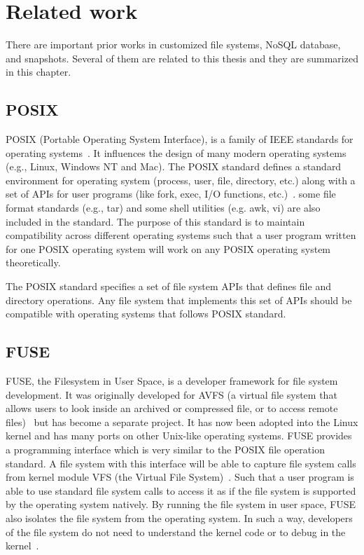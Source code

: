 \chapter{Related work}
\label{chap:related_work}

    There are important prior works in customized file systems, NoSQL database, and snapshots. Several of them are related to this thesis and they are summarized in this chapter.

\section{POSIX}

    POSIX (Portable Operating System Interface), is a family of IEEE standards for operating systems~\cite{posix_wiki}. It influences the design of many modern operating systems (e.g., Linux, Windows NT and Mac). The POSIX standard defines a standard environment for operating system (process, user, file, directory, etc.) along with a set of APIs for user programs (like fork, exec, I/O functions, etc.)~\cite{posix}. some file format standards (e.g., tar) and some shell utilities (e.g. awk, vi) are also included in the standard. The purpose of this standard is to maintain compatibility across different operating systems such that a user program written for one POSIX operating system will work on any POSIX operating system theoretically. 

    The POSIX standard specifies a set of file system APIs that defines file and directory operations. Any file system that implements this set of APIs should be compatible with operating systems that follows POSIX standard.

\section{FUSE}

    FUSE, the Filesystem in User Space, is a developer framework for file system development. It was originally developed for AVFS (a virtual file system that allows users to look inside an archived or compressed file, or to access remote files)~\cite{avfs} but has become a separate project. It has now been adopted into the Linux kernel and has many ports on other Unix-like operating systems. FUSE provides a programming interface which is very similar to the POSIX file operation standard. A file system with this interface will be able to capture file system calls from kernel module VFS (the Virtual File System)~\cite{vfs}. Such that a user program is able to use standard file system calls to access it as if the file system is supported by the operating system natively. By running the file system in user space, FUSE also isolates the file system from the operating system. In such a way, developers of the file system do not need to understand the kernel code or to debug in the kernel~\cite{fuse}.

